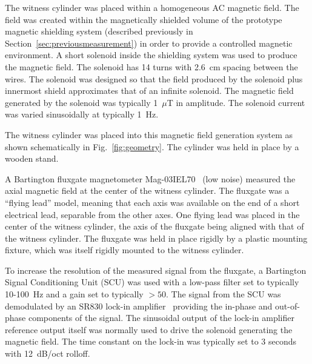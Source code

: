 The witness cylinder was placed within a homogeneous AC magnetic
field.  The field was created within the magnetically shielded volume
of the prototype magnetic shielding system (described previously in
Section~\ref{sec:previousmeasurement}) in order to provide a
controlled magnetic environment.  A short solenoid inside the
shielding system was used to produce the magnetic field.
The solenoid has 14 turns with 2.6~cm spacing between the wires.  The
solenoid was designed so that the field produced by the solenoid plus
innermost shield approximates that of an infinite solenoid.  The
magnetic field generated by the solenoid was typically 1~$\mu$T in
amplitude.  The solenoid current was varied sinusoidally at typically
1~Hz.

The witness cylinder was placed into this magnetic field generation
system as shown schematically in Fig.~\ref{fig:geometry}.  The
cylinder was held in place by a wooden stand.

A Bartington fluxgate magnetometer Mag-03IEL70~\cite{bib:bartman} (low
noise) measured the axial magnetic field at the center of the witness
cylinder.  The fluxgate was a ``flying lead'' model, meaning that each
axis was available on the end of a short electrical lead, separable
from the other axes.  One flying lead was placed in the center of the
witness cylinder, the axis of the fluxgate being aligned with that of
the witness cylinder.  The fluxgate was held in place rigidly by a
plastic mounting fixture, which was itself rigidly mounted to the
witness cylinder.

To increase the resolution of the measured signal from the fluxgate, a
Bartington Signal Conditioning Unit (SCU) was used with a low-pass
filter set to typically 10-100~Hz and a gain set to typically $>50$.
The signal from the SCU was demodulated by an SR830 lock-in
amplifier~\cite{bib:lockin} providing the in-phase and out-of-phase
components of the signal.  The sinusoidal output of the lock-in
amplifier reference output itself was normally used to drive the
solenoid generating the magnetic field.  The time constant on the
lock-in was typically set to 3 seconds with 12~dB/oct rolloff.

